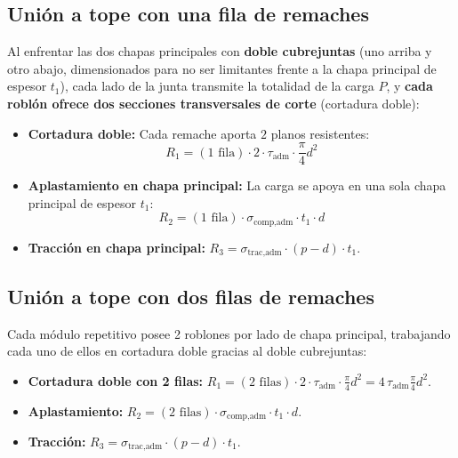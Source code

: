 \subsection{Unión a tope con una fila de remaches}
Al enfrentar las dos chapas principales con \textbf{doble cubrejuntas} (uno arriba y otro abajo, dimensionados para no ser limitantes frente a la chapa principal de espesor $t_1$), cada lado de la junta transmite la totalidad de la carga $P$, y \textbf{cada roblón ofrece dos secciones transversales de corte} (cortadura doble):
\begin{itemize}
    \item \textbf{Cortadura doble:} Cada remache aporta $2$ planos resistentes:
          \begin{equation*}
              R_1 = (1\text{ fila}) \cdot 2 \cdot \tau_{\text{adm}} \cdot \frac{\pi}{4}d^2
          \end{equation*}
    \item \textbf{Aplastamiento en chapa principal:} La carga se apoya en una sola chapa principal de espesor $t_1$:
          \begin{equation*}
              R_2 = (1\text{ fila}) \cdot \sigma_{\text{comp,adm}} \cdot t_1 \cdot d
          \end{equation*}
    \item \textbf{Tracción en chapa principal:} $R_3 = \sigma_{\text{trac,adm}} \cdot (p - d) \cdot t_1$.
\end{itemize}

\subsection{Unión a tope con dos filas de remaches}
Cada módulo repetitivo posee 2 roblones por lado de chapa principal, trabajando cada uno de ellos en cortadura doble gracias al doble cubrejuntas:
\begin{itemize}
    \item \textbf{Cortadura doble con 2 filas:} $R_1 = (2\text{ filas}) \cdot 2 \cdot \tau_{\text{adm}} \cdot \frac{\pi}{4}d^2 = 4\,\tau_{\text{adm}}\frac{\pi}{4}d^2$.
    \item \textbf{Aplastamiento:} $R_2 = (2\text{ filas}) \cdot \sigma_{\text{comp,adm}} \cdot t_1 \cdot d$.
    \item \textbf{Tracción:} $R_3 = \sigma_{\text{trac,adm}} \cdot (p - d) \cdot t_1$.
\end{itemize}

